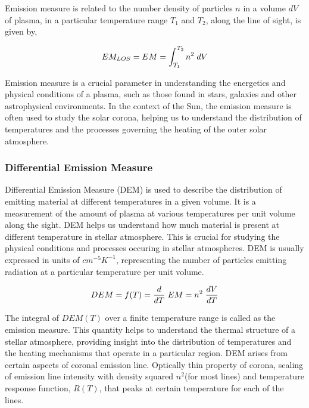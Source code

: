 Emission measure is related to the number density of particles $n$ in a volume $dV$ of plasma, in a particular temperature range $T_1$ and $T_2$, along the line of sight, is given by,

\vspace{-0.75cm}
\begin{center}
    \begin{equation*}
        EM_{LOS} = EM = \int_{T_1}^{T_2} n^2 \hspace{0.1cm} dV
    \end{equation*}
\end{center}

Emission measure is a crucial parameter in understanding the energetics and physical conditions of a plasma, such as those found in stars, galaxies and other astrophysical environments. In the context of the Sun, the emission measure is often used to study the solar corona, helping us to understand the distribution of temperatures and the processes governing the heating of the outer solar atmosphere.

\subsubsection{Differential Emission Measure}

Differential Emission Measure (DEM) is used to describe the distribution of emitting material at different temperatures in a given volume. It is a measurement of the amount of plasma at various temperatures per unit volume along the sight. DEM helps us understand how much material is present at different temperature in stellar atmosphere. This is crucial for studying the physical conditions and processes occuring in stellar atmospheres. DEM is usually expressed in units of $cm^{-5}K^{-1}$, representing the number of particles emitting radiation at a particular temperature per unit volume.

\vspace{-.75cm}
\everymath{\displaystyle}
\begin{center}
    \begin{equation*}
        DEM = f(T) = \frac{d}{dT}\hspace{0.1cm} EM = n^2 \hspace{0.1cm} \frac{dV}{dT}
    \end{equation*}
\end{center}

The integral of $DEM(T)$ over a finite temperature range is called as the emission measure. This quantity helps to understand the thermal structure of a stellar atmosphere, providing insight into the distribution of temperatures and the heating mechanisms that operate in a particular region. DEM arises from certain aspects of coronal emission line. Optically thin property of corona, scaling of emission line intensity with density squared $n^2$(for most lines) and temperature response function, $R(T)$, that peaks at certain temperature for each of the lines.

